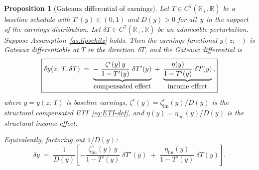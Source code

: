\documentclass[12pt,a4paper]{article}
\theoremstyle{definition}
\theoremstyle{plain}
\newtheorem{proposition}{Proposition}[section]
\theoremstyle{remark}
\newcommand{\R}{\mathbb{R}}
\begin{document}
\begin{proposition}[Gateaux differential of earnings]
\label{prop:GWT-1D}
Let $T \in C^2(\R_+,\R)$ be a baseline schedule with $T'(y) \in (0,1)$ and $D(y) > 0$ for all~$y$ in the support of the earnings distribution.  Let $\delta T \in C^2(\R_+,\R)$ be an admissible perturbation.  Suppose Assumption~\ref{as:lipschitz} holds.  Then the earnings functional $y(z;\,\cdot)$ is Gateaux differentiable at $T$ in the direction~$\delta T$, and the Gateaux differential is
\begin{equation}
\label{eq:GWT-delta-y}
  \boxed{%
  \delta y(z;\,T,\delta T)
  \;=\;
  \underbrace{-\;\frac{\zeta^c(y)\,y}{1-T'(y)}\;\delta T'(y)}_{\displaystyle\text{compensated effect}}
  \;+\;
  \underbrace{\frac{\eta(y)}{1-T'(y)}\;\delta T(y)}_{\displaystyle\text{income effect}}\,,}
\end{equation}
where $y = y(z;\,T)$ is baseline earnings, $\zeta^c(y) = \zeta^c_{\mathrm{lin}}(y)/D(y)$ is the structural compensated ETI~\eqref{eq:ETI-def}, and $\eta(y) = \eta_{\mathrm{lin}}(y)/D(y)$ is the structural income effect.

Equivalently, factoring out $1/D(y)$:
\begin{equation}
\label{eq:GWT-delta-y-lin}
  \delta y
  \;=\;
  \frac{1}{D(y)}
  \left[
    -\frac{\zeta^c_{\mathrm{lin}}(y)\,y}{1-T'(y)}\;\delta T'(y)
    \;+\;
    \frac{\eta_{\mathrm{lin}}(y)}{1-T'(y)}\;\delta T(y)
  \right].
\end{equation}
\end{proposition}
\end{document}
